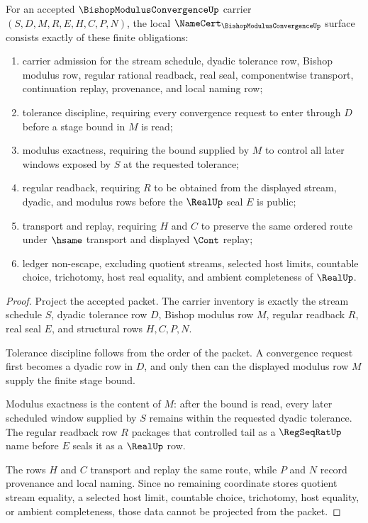 \begin{theorem}
\label{thm:bishop-modulus-convergence-namecert-obligations}
For an accepted $\BishopModulusConvergenceUp$ carrier $(S,D,M,R,E,H,C,P,N)$, the local $\NameCert_{\BishopModulusConvergenceUp}$ surface consists exactly of these finite obligations:
\begin{enumerate}
\item carrier admission for the stream schedule, dyadic tolerance row, Bishop modulus row, regular rational readback, real seal, componentwise transport, continuation replay, provenance, and local naming row;
\item tolerance discipline, requiring every convergence request to enter through $D$ before a stage bound in $M$ is read;
\item modulus exactness, requiring the bound supplied by $M$ to control all later windows exposed by $S$ at the requested tolerance;
\item regular readback, requiring $R$ to be obtained from the displayed stream, dyadic, and modulus rows before the $\RealUp$ seal $E$ is public;
\item transport and replay, requiring $H$ and $C$ to preserve the same ordered route under $\hsame$ transport and displayed $\Cont$ replay;
\item ledger non-escape, excluding quotient streams, selected host limits, countable choice, trichotomy, host real equality, and ambient completeness of $\RealUp$.
\end{enumerate}
\end{theorem}
\begin{proof}
Project the accepted packet. The carrier inventory is exactly the stream schedule $S$, dyadic tolerance row $D$, Bishop modulus row $M$, regular readback $R$, real seal $E$, and structural rows $H,C,P,N$.

Tolerance discipline follows from the order of the packet. A convergence request first becomes a dyadic row in $D$, and only then can the displayed modulus row $M$ supply the finite stage bound.

Modulus exactness is the content of $M$: after the bound is read, every later scheduled window supplied by $S$ remains within the requested dyadic tolerance. The regular readback row $R$ packages that controlled tail as a $\RegSeqRatUp$ name before $E$ seals it as a $\RealUp$ row.

The rows $H$ and $C$ transport and replay the same route, while $P$ and $N$ record provenance and local naming. Since no remaining coordinate stores quotient stream equality, a selected host limit, countable choice, trichotomy, host equality, or ambient completeness, those data cannot be projected from the packet.
\end{proof}

